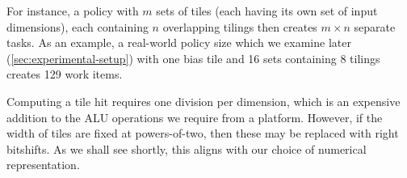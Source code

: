 For instance, a policy with $m$ sets of tiles (each having its own set of input dimensions), each containing $n$ overlapping tilings then creates $m \times n$ separate tasks.
As an example, a real-world policy size which we examine later (\cref{sec:experimental-setup}) with one bias tile and \num{16} sets containing \num{8} tilings creates \num{129} work items.

Computing a tile hit requires one division per dimension, which is an expensive addition to the ALU operations we require from a platform.
However, if the width of tiles are fixed at powers-of-two, then these may be replaced with right bitshifts.
As we shall see shortly, this aligns with our choice of numerical representation.
